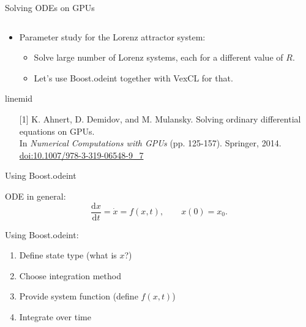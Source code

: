 \documentclass[@BEAMER_OPTIONS@]{beamer}
\newcommand{\footnoteline}{\begin{beamercolorbox}[wd=\textwidth,ht=.1ex,dp=0ex]{linemid}\end{beamercolorbox}}
\begin{document}
\begin{frame}{Solving ODEs on GPUs}
\begin{columns}
\begin{column}{0.4\textwidth}
        \end{column}
    \end{columns}
    \begin{itemize}
        \item Parameter study for the Lorenz attractor system:
            \begin{itemize}
                \item Solve large number of Lorenz systems, each
                    for a different value of $R$.
                \item Let's use Boost.odeint together with VexCL
                    for that.
            \end{itemize}
    \end{itemize}
    \footnoteline
    \begin{footnotesize}
        \begin{itemize}
            \item[{[1]}] K. Ahnert, D. Demidov, and M. Mulansky.  Solving
                ordinary differential equations on GPUs.\\
                In \emph{Numerical Computations with GPUs} (pp. 125-157).
                Springer, 2014.
                \href{http://dx.doi.org/10.1007/978-3-319-06548-9\_7}{doi:10.1007/978-3-319-06548-9\_7}
        \end{itemize}
    \end{footnotesize}
\end{frame}

\begin{frame}{Using Boost.odeint}
    \begin{block}{ODE in general:}
        \begin{equation*}
            \frac{\mbox{d} x}{\mbox{d} t } = \dot{x} = f(x , t),
            \quad \quad x(0) = x_0.
        \end{equation*}
    \end{block}

    \vspace{\baselineskip}

    \begin{exampleblock}{Using Boost.odeint:}
        \begin{enumerate}
            \item Define state type (what is $x$?)
            \item Choose integration method
            \item Provide system function (define $f(x,t)$)
            \item Integrate over time
        \end{enumerate}
    \end{exampleblock}
\end{frame}
\end{document}
